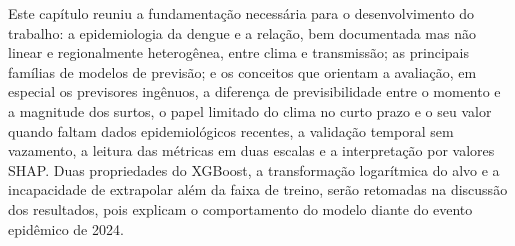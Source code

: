 Este capítulo reuniu a fundamentação necessária para o desenvolvimento do trabalho: a epidemiologia da dengue e a relação, bem documentada mas não linear e regionalmente heterogênea, entre clima e transmissão; as principais famílias de modelos de previsão; e os conceitos que orientam a avaliação, em especial os previsores ingênuos, a diferença de previsibilidade entre o momento e a magnitude dos surtos, o papel limitado do clima no curto prazo e o seu valor quando faltam dados epidemiológicos recentes, a validação temporal sem vazamento, a leitura das métricas em duas escalas e a interpretação por valores SHAP. Duas propriedades do XGBoost, a transformação logarítmica do alvo e a incapacidade de extrapolar além da faixa de treino, serão retomadas na discussão dos resultados, pois explicam o comportamento do modelo diante do evento epidêmico de 2024.
